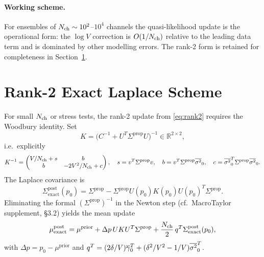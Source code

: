 \documentclass[11pt]{article}
\begin{document}
\paragraph{Working scheme.}
For ensembles of $N_{\mathrm{ch}}\sim 10^2$--$10^4$ channels the quasi-likelihood
update is the operational form: the $\log V$ correction is $O(1/N_{\mathrm{ch}})$
relative to the leading data term and is dominated by other modelling
errors. The rank-2 form is retained for completeness in
Section~\ref{sec:rank2-exact}.

\section{Rank-2 Exact Laplace Scheme}\label{sec:rank2-exact}

For small $N_{\mathrm{ch}}$ or stress tests, the rank-2 update from
\eqref{eq:rank2} requires the Woodbury identity. Set
\begin{equation}
  K = \bigl(C^{-1} + U^{T}\Sigma^{\mathrm{prop}}U\bigr)^{-1}
  \in\mathbb{R}^{2\times 2},
  \label{eq:Kdef}
\end{equation}
i.e.\ explicitly
\[
  K^{-1} =
  \begin{pmatrix}
    V/N_{\mathrm{ch}} + s & b\\
    b          & -2V^2/N_{\mathrm{ch}} + c
  \end{pmatrix},
  \quad
  s=v^{T}\Sigma^{\mathrm{prop}}v,
  \quad
  b=v^{T}\Sigma^{\mathrm{prop}}\overline{\sigma^2}_0,
  \quad
  c=\overline{\sigma^2}_0^{T}\Sigma^{\mathrm{prop}}\overline{\sigma^2}_0.
\]
The Laplace covariance is
\begin{equation}
  \Sigma^{\mathrm{post}}_{\mathrm{exact}}(p_0)
  = \Sigma^{\mathrm{prop}}
  - \Sigma^{\mathrm{prop}}U(p_0)K(p_0)U(p_0)^{T}\Sigma^{\mathrm{prop}}.
  \label{eq:Sigma_post_exact}
\end{equation}
Eliminating the formal $(\Sigma^{\mathrm{prop}})^{-1}$ in the Newton
step (cf.\ MacroTaylor supplement, §3.2) yields the mean update
\begin{equation}
  \mu^{\mathrm{post}}_{\mathrm{exact}}
  = \mu^{\mathrm{prior}}
  + \Delta p\,U K U^{T}\Sigma^{\mathrm{prop}}
  + \frac{N_{\mathrm{ch}}}{2}\,q^{T}\Sigma^{\mathrm{post}}_{\mathrm{exact}}(p_0),
  \label{eq:mu_post_exact}
\end{equation}
with $\Delta p=p_0-\mu^{\mathrm{prior}}$ and
$q^{T}=(2\delta/V)\overline{\gamma}_0^{T}+(\delta^2/V^2-1/V)\overline{\sigma^2}_0^{T}$.

\end{document}
